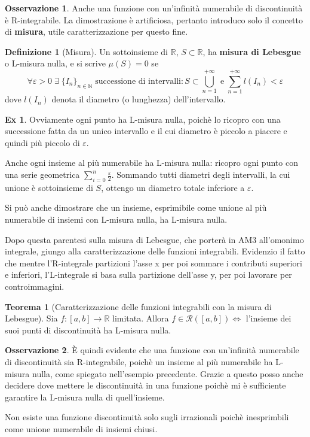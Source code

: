 \documentclass{article}
\theoremstyle{definition}
\newtheorem{theorem}{Teorema}[section]
\theoremstyle{definition}
\theoremstyle{definition}
\newtheorem{definition}{Definizione}[section]
\theoremstyle{definition}
\newtheorem{remark}{Osservazione}[section]
\theoremstyle{definition}
\newtheorem{example}{Ex}[section]
\begin{document}
\begin{remark}
    Anche una funzione con un'infinità numerabile di discontinuità è R-integrabile. La dimostrazione è artificiosa, pertanto introduco solo il concetto di \textbf{misura}, utile caratterizzazione per questo fine.
\end{remark}

\begin{definition}[Misura]
    Un sottoinsieme di $\mathbb{R}$, $S\subset \mathbb{R}$, ha \textbf{misura di Lebesgue} o L-misura nulla, e si scrive $\mu(S)=0$ se 
    \[
        \forall \varepsilon > 0 \; \exists \; \lbrace I_n \rbrace_{n\in \mathbb{N}} \; \text{successione di intervalli} : S \subset \bigcup_{n=1}^{+\infty} \; \text{e} \; \sum_{n=1}^{+\infty} l(I_n)<\varepsilon
    \]
    dove $l(I_n)$ denota il diametro (o lunghezza) dell'intervallo.
\end{definition}

\begin{example}
    Ovviamente ogni punto ha L-misura nulla, poichè lo ricopro con una successione fatta da un unico intervallo e il cui diametro è piccolo a piacere e quindi più piccolo di $\varepsilon$.

    Anche ogni insieme al più numerabile ha L-misura nulla: ricopro ogni punto con una serie geometrica $\displaystyle\sum_{i=0}^{n}\frac{\varepsilon}{2}$. Sommando tutti diametri degli intervalli, la cui unione è sottoinsieme di $S$, ottengo un diametro totale inferiore a $\varepsilon$.

    Si può anche dimostrare che un insieme, esprimibile come unione al più numerabile di insiemi con L-misura nulla, ha L-misura nulla.
\end{example}

Dopo questa parentesi sulla misura di Lebesgue, che porterà in AM3 all'omonimo integrale, giungo alla caratterizzazione delle funzioni integrabili. Evidenzio il fatto che mentre l'R-integrale partizioni l'asse x per poi sommare i contributi superiori e inferiori, l'L-integrale si basa sulla partizione dell'asse y, per poi lavorare per controimmagini.

\begin{theorem}[Caratterizzazione delle funzioni integrabili con la misura di Lebesgue]
    Sia $f:[a,b] \rightarrow \mathbb{R}$ limitata. Allora $f\in \mathcal{R}([a,b]) \Leftrightarrow$ l'insieme dei suoi punti di discontinuità ha L-misura nulla. 
\end{theorem}

\begin{remark}
    È quindi evidente che una funzione con un'infinità numerabile di discontinuità sia R-integrabile, poichè un insieme al più numerabile ha L-misura nulla, come spiegato nell'esempio precedente. Grazie a questo posso anche decidere dove mettere le discontinuità in una funzione poichè mi è sufficiente garantire la L-misura nulla di quell'insieme.

    Non esiste una funzione discontinuità solo sugli irrazionali poichè inesprimbili come unione numerabile di insiemi chiusi.
\end{remark}
\end{document}
